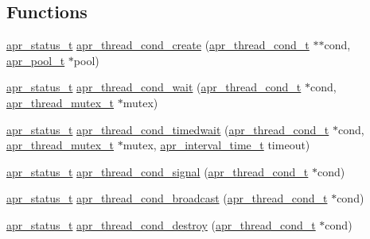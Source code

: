 \subsection*{Functions}
\begin{DoxyCompactItemize}
\item 
\hyperlink{group__apr__errno_gaf76ee4543247e9fb3f3546203e590a6c}{apr\-\_\-status\-\_\-t} \hyperlink{group__apr__thread__cond_gab39e8b722d46d23466e9e346ada85a7f}{apr\-\_\-thread\-\_\-cond\-\_\-create} (\hyperlink{group__apr__thread__cond_gae8f918d38bf1c58bc09670eee456ae5e}{apr\-\_\-thread\-\_\-cond\-\_\-t} $\ast$$\ast$cond, \hyperlink{group__apr__pools_gaf137f28edcf9a086cd6bc36c20d7cdfb}{apr\-\_\-pool\-\_\-t} $\ast$pool)
\item 
\hyperlink{group__apr__errno_gaf76ee4543247e9fb3f3546203e590a6c}{apr\-\_\-status\-\_\-t} \hyperlink{group__apr__thread__cond_ga789719a5f02bdab8b8abbc8bddd0406b}{apr\-\_\-thread\-\_\-cond\-\_\-wait} (\hyperlink{group__apr__thread__cond_gae8f918d38bf1c58bc09670eee456ae5e}{apr\-\_\-thread\-\_\-cond\-\_\-t} $\ast$cond, \hyperlink{group__apr__thread__mutex_ga95712060ba3a192036416e1ccef1db75}{apr\-\_\-thread\-\_\-mutex\-\_\-t} $\ast$mutex)
\item 
\hyperlink{group__apr__errno_gaf76ee4543247e9fb3f3546203e590a6c}{apr\-\_\-status\-\_\-t} \hyperlink{group__apr__thread__cond_ga67f2feecb7fa1929cc9b354dafd00306}{apr\-\_\-thread\-\_\-cond\-\_\-timedwait} (\hyperlink{group__apr__thread__cond_gae8f918d38bf1c58bc09670eee456ae5e}{apr\-\_\-thread\-\_\-cond\-\_\-t} $\ast$cond, \hyperlink{group__apr__thread__mutex_ga95712060ba3a192036416e1ccef1db75}{apr\-\_\-thread\-\_\-mutex\-\_\-t} $\ast$mutex, \hyperlink{group__apr__time_gaae2129185a395cc393f76fabf4f43e47}{apr\-\_\-interval\-\_\-time\-\_\-t} timeout)
\item 
\hyperlink{group__apr__errno_gaf76ee4543247e9fb3f3546203e590a6c}{apr\-\_\-status\-\_\-t} \hyperlink{group__apr__thread__cond_gadf7ad6c2731bc6128f969d3efc7ff5eb}{apr\-\_\-thread\-\_\-cond\-\_\-signal} (\hyperlink{group__apr__thread__cond_gae8f918d38bf1c58bc09670eee456ae5e}{apr\-\_\-thread\-\_\-cond\-\_\-t} $\ast$cond)
\item 
\hyperlink{group__apr__errno_gaf76ee4543247e9fb3f3546203e590a6c}{apr\-\_\-status\-\_\-t} \hyperlink{group__apr__thread__cond_gafbbedd2a07629fe3186343035ae83152}{apr\-\_\-thread\-\_\-cond\-\_\-broadcast} (\hyperlink{group__apr__thread__cond_gae8f918d38bf1c58bc09670eee456ae5e}{apr\-\_\-thread\-\_\-cond\-\_\-t} $\ast$cond)
\item 
\hyperlink{group__apr__errno_gaf76ee4543247e9fb3f3546203e590a6c}{apr\-\_\-status\-\_\-t} \hyperlink{group__apr__thread__cond_ga049e646e23c670f3a79fe25401b9c1b0}{apr\-\_\-thread\-\_\-cond\-\_\-destroy} (\hyperlink{group__apr__thread__cond_gae8f918d38bf1c58bc09670eee456ae5e}{apr\-\_\-thread\-\_\-cond\-\_\-t} $\ast$cond)
$$
\end{DoxyCompactItemize}
